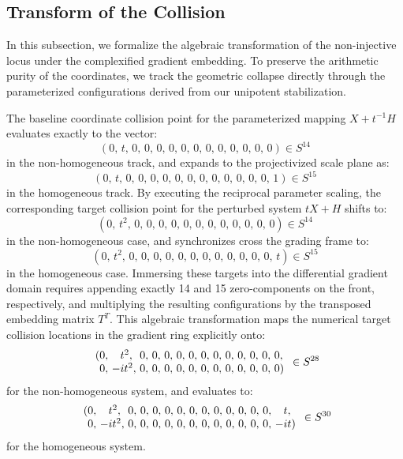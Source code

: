 \documentclass[11pt,a4paper]{article}
\begin{document}
\subsection{Transform of the Collision}
\label{subsec:transform_collision}

In this subsection, we formalize the algebraic transformation of the non-injective locus under the complexified gradient embedding. To preserve the arithmetic purity of the coordinates, we track the geometric collapse directly through the parameterized configurations derived from our unipotent stabilization.

The baseline coordinate collision point for the parameterized mapping $X + t^{-1}H$ evaluates exactly to the vector:
\begin{equation}
(0, \, t, \, 0, \, 0, \, 0, \, 0, \, 0, \, 0, \, 0, \, 0, \, 0, \, 0, \, 0, \, 0) \in S^{14}
\end{equation}
in the non-homogeneous track, and expands to the projectivized scale plane as:
\begin{equation}
(0, \, t, \, 0, \, 0, \, 0, \, 0, \, 0, \, 0, \, 0, \, 0, \, 0, \, 0, \, 0, \, 0, \, 1) \in S^{15}
\end{equation}
in the homogeneous track. By executing the reciprocal parameter scaling, the corresponding target collision point for the perturbed system $tX + H$ shifts to:
\begin{equation}
(0, \, t^2, \, 0, \, 0, \, 0, \, 0, \, 0, \, 0, \, 0, \, 0, \, 0, \, 0, \, 0, \, 0) \in S^{14}
\end{equation}
in the non-homogeneous case, and synchronizes cross the grading frame to:
\begin{equation}
(0, \, t^2, \, 0, \, 0, \, 0, \, 0, \, 0, \, 0, \, 0, \, 0, \, 0, \, 0, \, 0, \, 0, \, t) \in S^{15}
\end{equation}
in the homogeneous case. Immersing these targets into the differential gradient domain requires appending exactly 14 and 15 zero-components on the front, respectively, and multiplying the resulting configurations by the transposed embedding matrix $T^T$. This algebraic transformation maps the numerical target collision locations in the gradient ring explicitly onto:
\begin{equation}
\begin{array}{l}
(0, \, \hphantom{-}t^2, \, \hphantom{i}0, \, 0, \, 0, \, 0, \, 0, \, 0, \, 0, \, 0, \, 0, \, 0, \, 0, \, 0, \\
\hphantom{(}0, \, -i t^2, \, 0, \, 0, \, 0, \, 0, \, 0, \, 0, \, 0, \, 0, \, 0, \, 0, \, 0, \, 0)
\end{array} \in S^{28}
\end{equation}
for the non-homogeneous system, and evaluates to:
\begin{equation}
\begin{array}{l}
(0, \, \hphantom{-}t^2, \, \hphantom{i}0, \, 0, \, 0, \, 0, \, 0, \, 0, \, 0, \, 0, \, 0, \, 0, \, 0, \, 0, \, \hphantom{-}t, \\
\hphantom{(}0, \, -i t^2, \, 0, \, 0, \, 0, \, 0, \, 0, \, 0, \, 0, \, 0, \, 0, \, 0, \, 0, \, 0, \, -i t)
\end{array} \in S^{30}
\end{equation}
for the homogeneous system.
\end{document}
